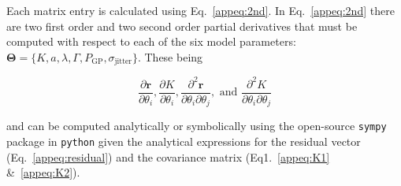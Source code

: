 Each matrix entry is calculated using Eq.~\ref{appeq:2nd}. In Eq.~\ref{appeq:2nd} there are
two first order and two second order partial derivatives that must be computed with respect to each of the six model parameters:
$\boldsymbol{\Theta} = \{K, a, \lambda, \Gamma, P_{\text{GP}}, \sigma_{\text{jitter}} \}$. These being

\begin{equation}
  \frac{\partial \mathbf{r}}{\partial \theta_i}, \frac{\partial K}{\partial \theta_i},
  \frac{\partial^2 \mathbf{r}}{\partial \theta_i \partial \theta_j}, \text{ and } \frac{\partial^2 K}{\partial \theta_i \partial \theta_j}  
\end{equation}
  
\noindent and can be computed analytically or symbolically using the open-source \texttt{sympy} package in \texttt{python} given the
analytical expressions for the residual vector (Eq.~\ref{appeq:residual}) and the covariance matrix (Eq1.~\ref{appeq:K1} \&~\ref{appeq:K2}).




